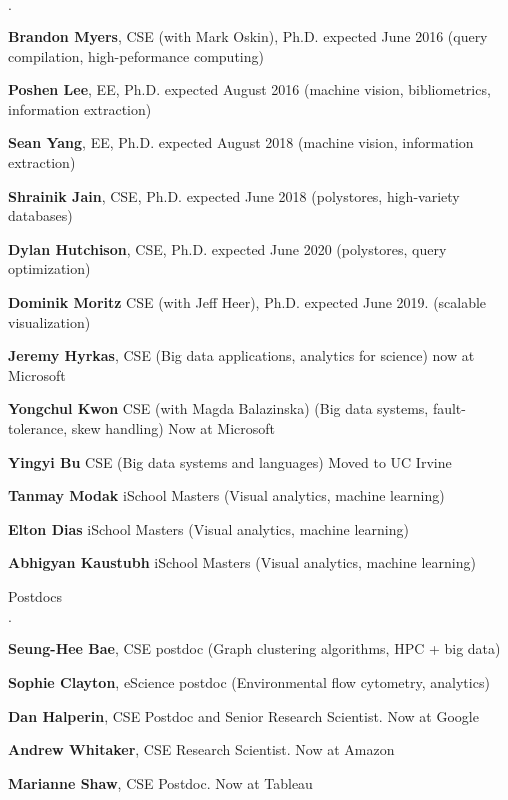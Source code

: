 \documentclass[10pt]{article}
\newenvironment{bulletlist}
   {
      \begin{list}
         {$\cdot$}
         {
            \setlength{\itemsep}{.7ex}
            \setlength{\parsep}{0ex}
            \setlength{\leftmargin}{0.7em}
            \setlength{\parskip}{0ex}
            \setlength{\topsep}{0ex}
         }
   }
   {
      \end{list}
   }
\newcommand{\marginlabel}[1]{
\begin{minipage}[b]{0.8\labelwidth}{\large \textsf{\textbf{#1}}}\end{minipage}}
\newcommand{\entrylabel}[1]{\mbox{\marginlabel{#1}}\hfill}
\newcommand{\MainListlabel}[1]
   {
      \parbox[t]{\labelwidth}{\hspace{.8em}\marginlabel{#1}}
   }
\newenvironment{MainList}[1]
   {
      \renewcommand{\entrylabel}{\MainListlabel}
      \begin{list}{}
      {
         \renewcommand{\makelabel}{\entrylabel}
         \setlength   {\itemindent}{-.65em}
         \setlength   {\labelwidth}{#1}
         \setlength   {\leftmargin}{\labelwidth}
         \setlength   {\itemsep}{3ex}
      }
   }
   {
      \end{list}
   }
\begin{document}
\begin{MainList}{88pt}
\begin{bulletlist}
\item {\bf Brandon Myers}, CSE (with Mark Oskin), Ph.D. expected June 2016 (query compilation, high-peformance computing)
\item {\bf Poshen Lee}, EE, Ph.D. expected August 2016 (machine vision, bibliometrics, information extraction)
\item {\bf Sean Yang}, EE, Ph.D. expected August 2018 (machine vision, information extraction)
\item {\bf Shrainik Jain}, CSE, Ph.D. expected June 2018 (polystores, high-variety databases)
\item {\bf Dylan Hutchison}, CSE, Ph.D. expected June 2020 (polystores, query optimization)
\item {\bf Dominik Moritz} CSE (with Jeff Heer), Ph.D. expected June 2019. (scalable visualization)
\item {\bf Jeremy Hyrkas}, CSE (Big data applications, analytics for science) now at Microsoft
\item {\bf Yongchul Kwon} CSE (with Magda Balazinska) (Big data systems, fault-tolerance, skew handling) Now at Microsoft
\item {\bf Yingyi Bu} CSE (Big data systems and languages) Moved to UC Irvine
\item {\bf Tanmay Modak} iSchool Masters (Visual analytics, machine learning)
\item {\bf Elton Dias} iSchool Masters (Visual analytics, machine learning)
\item {\bf Abhigyan Kaustubh} iSchool Masters (Visual analytics, machine learning)
\end{bulletlist}

\item [Postdocs]

\begin{bulletlist}
\item {\bf Seung-Hee Bae}, CSE postdoc (Graph clustering algorithms, HPC + big data)
\item {\bf Sophie Clayton}, eScience postdoc (Environmental flow cytometry, analytics)
\item {\bf Dan Halperin}, CSE Postdoc and Senior Research Scientist. Now at Google
\item {\bf Andrew Whitaker}, CSE Research Scientist.  Now at Amazon
\item {\bf Marianne Shaw}, CSE Postdoc. Now at Tableau
\end{bulletlist}



\end{MainList}
\end{document}
